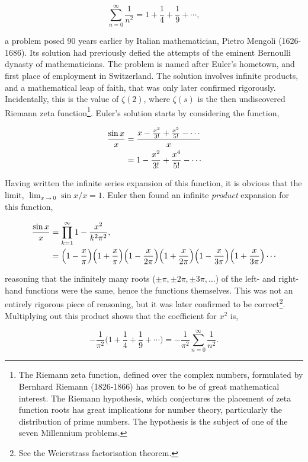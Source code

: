 \documentclass[11pt]{amsart}
\begin{document}
$$\sum_{n=0}^{\infty}\frac{1}{n^2} = 1 + \frac{1}{4} + \frac{1}{9} + \cdots,$$

a problem posed 90 years earlier by Italian mathematician, Pietro Mengoli (1626-1686). Its solution had previously defied the attempts of the eminent Bernoulli dynasty of mathematicians. The problem is named after Euler's hometown, and first place of employment in Switzerland. The solution involves infinite products, and a mathematical leap of faith, that was only later confirmed rigorously. Incidentally, this is the value of $\zeta(2)$, where $\zeta(s)$ is the then undiscovered Riemann zeta function\footnote{The Riemann zeta function, defined over the complex numbers, formulated by Bernhard Riemann (1826-1866) has proven to be of great mathematical interest. The Riemann hypothesis, which conjectures the placement of zeta function roots has great implications for number theory, particularly the distribution of prime numbers. The hypothesis is the subject of one of the seven Millennium problems.}. Euler's solution starts by considering the function,

\begin{align}
\frac{\sin x}{x} &= \frac{ x - \frac{x^3}{3!} + \frac{x^5}{5!} - \cdots}{x}  \notag \\
&=  1 - \frac{x^2}{3!} + \frac{x^4}{5!} - \cdots \label{eq:sinx}
\end{align}

Having written the infinite series expansion of this function, it is obvious that the limit, $\lim_{x\to 0} \sin x / x = 1$. Euler then found an infinite \emph{product} expansion for this function,

\begin{align}
\frac{\sin x}{x} &= \prod_{k=1}^{\infty}1 - \frac{x^2}{k^2\pi^2}, \notag \\
&= \Big(1 - \frac{x}{\pi}\Big)\Big(1 + \frac{x}{\pi}\Big)\Big(1 - \frac{x}{2\pi}\Big)\Big(1 + \frac{x}{2\pi}\Big)\Big(1 - \frac{x}{3\pi}\Big)\Big(1 + \frac{x}{3\pi}\Big)\cdots \notag
\end{align}

reasoning that the infinitely many roots ($\pm\pi, \pm2\pi, \pm3\pi, \dots $) of the left- and right-hand functions were the same, hence the functions themselves. This was not an entirely rigorous piece of reasoning, but it was later confirmed to be correct\footnote{See the Weierstrass factorisation theorem.}. Multiplying out this product shows that the coefficient for $x^2$ is,

$$
-\frac{1}{\pi^2}\Big(1 + \frac{1}{4} + \frac{1}{9} + \cdots \Big)= -\frac{1}{\pi^2}\sum_{n=0}^{\infty}\frac{1}{n^2}.
$$
\end{document}
